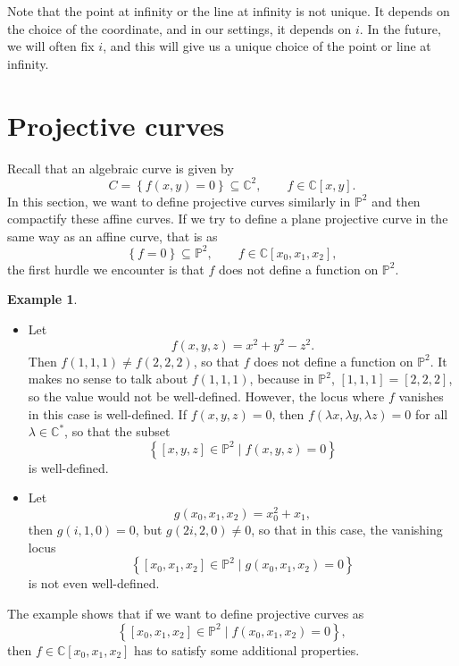 \documentclass{article}
\newcommand{\C}{\mathbb{C}}
\renewcommand{\P}{\mathbb{P}}
\newcommand{\rb}[1]{\left( #1 \right)}
\renewcommand{\sb}[1]{\left[ #1 \right]}
\newcommand{\cb}[1]{\left\{ #1 \right\}}
\theoremstyle{definition}\newtheorem{definition}{Definition}[section]
\theoremstyle{definition}\newtheorem{notation}[definition]{Notation}
\theoremstyle{definition}\newtheorem{remark}[definition]{Remark}
\theoremstyle{definition}\newtheorem{example1}[definition]{Example}
\theoremstyle{definition}\newtheorem{fact}{Fact}
\theoremstyle{definition}\newtheorem{exercise}{Exercise}
\theoremstyle{definition}\newtheorem*{example2}{Example}
\begin{document}
Note that the point at infinity or the line at infinity is not unique. It depends on the choice of the coordinate, and in our settings, it depends on $ i $. In the future, we will often fix $ i $, and this will give us a unique choice of the point or line at infinity.

\pagebreak


\section{Projective curves}

Recall that an algebraic curve is given by
$$ C = \cb{f\rb{x, y} = 0} \subseteq \C^2, \qquad f \in \C\sb{x, y}. $$
In this section, we want to define projective curves similarly in $ \P^2 $ and then compactify these affine curves. If we try to define a plane projective curve in the same way as an affine curve, that is as
$$ \cb{f = 0} \subseteq \P^2, \qquad f \in \C\sb{x_0, x_1, x_2}, $$
the first hurdle we encounter is that $ f $ does not define a function on $ \P^2 $.

\begin{example1}
\hfill
\begin{itemize}
\item Let
$$ f\rb{x, y, z} = x^2 + y^2 - z^2. $$
Then $ f\rb{1, 1, 1} \ne f\rb{2, 2, 2} $, so that $ f $ does not define a function on $ \P^2 $. It makes no sense to talk about $ f\rb{1, 1, 1} $, because in $ \P^2 $, $ \sb{1, 1, 1} = \sb{2, 2, 2} $, so the value would not be well-defined. However, the locus where $ f $ vanishes in this case is well-defined. If $ f\rb{x, y, z} = 0 $, then $ f\rb{\lambda x, \lambda y, \lambda z} = 0 $ for all $ \lambda \in \C^* $, so that the subset
$$ \cb{\sb{x, y, z} \in \P^2 \mid f\rb{x, y, z} = 0} $$
is well-defined.
\item Let
$$ g\rb{x_0, x_1, x_2} = x_0^2 + x_1, $$
then $ g\rb{i, 1, 0} = 0 $, but $ g\rb{2i, 2, 0} \ne 0 $, so that in this case, the vanishing locus
$$ \cb{\sb{x_0, x_1, x_2} \in \P^2 \mid g\rb{x_0, x_1, x_2} = 0} $$
is not even well-defined.
\end{itemize}
\end{example1}

The example shows that if we want to define projective curves as
$$ \cb{\sb{x_0, x_1, x_2} \in \P^2 \mid f\rb{x_0, x_1, x_2} = 0}, $$
then $ f \in \C\sb{x_0, x_1, x_2} $ has to satisfy some additional properties.
\end{document}

